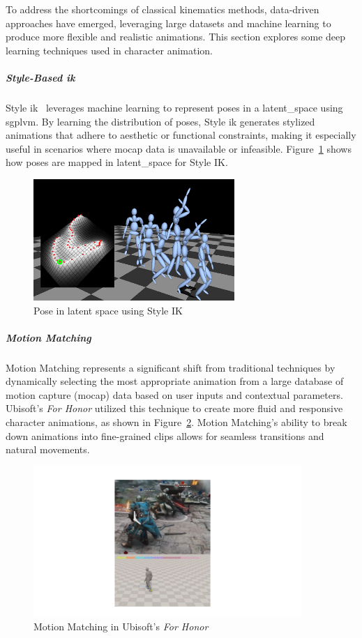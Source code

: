 \documentclass[../../main.tex]{subfiles}
\begin{document}
To address the shortcomings of classical kinematics methods, data-driven approaches have emerged, leveraging large datasets and machine learning to produce more flexible and realistic animations. This section explores some deep learning techniques used in character animation.

\subparagraph{Style-Based \gls{ik}}
\label{ch:background_work:sign_language_synthesis:3d_techniques:avatar_animation:deep_learning:style_ik}

Style \gls{ik}~\cite{grochow2004style} leverages machine learning to represent poses in a \gls{latent_space} using \gls{sgplvm}. By learning the distribution of poses, Style \gls{ik} generates stylized animations that adhere to aesthetic or functional constraints, making it especially useful in scenarios where mocap data is unavailable or infeasible. Figure~\ref{fig:style_ik} shows how poses are mapped in \gls{latent_space} for Style IK.

\begin{figure}
  \centering \includegraphics[width = 3in]{chapters/background_work/images/style_ik.png}
  \caption{Pose in latent space using Style IK}
  \label{fig:style_ik}
\end{figure}

\subparagraph{Motion Matching}
\label{ch:background_work:sign_language_synthesis:3d_techniques:avatar_animation:deep_learning:motion_matching}

Motion Matching represents a significant shift from traditional techniques by dynamically selecting the most appropriate animation from a large database of motion capture (mocap) data based on user inputs and contextual parameters. Ubisoft's \emph{For Honor} utilized this technique to create more fluid and responsive character animations, as shown in Figure~\ref{fig:for_honor}. Motion Matching's ability to break down animations into fine-grained clips allows for seamless transitions and natural movements.

\begin{figure}
  \centering \includegraphics[width = 4in]{chapters/background_work/images/for_honor.png}
  \caption{Motion Matching in Ubisoft’s \emph{For Honor}}
  \label{fig:for_honor}
\end{figure}
\end{document}
